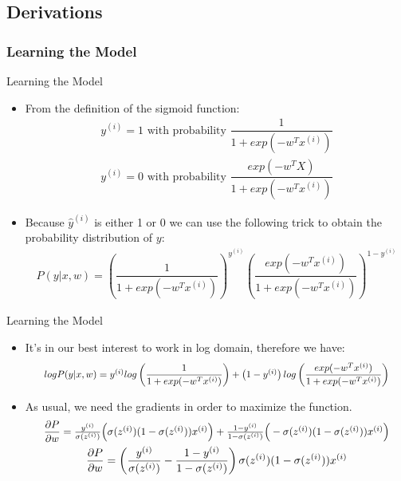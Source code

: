 \subsection{Derivations}
\subsubsection{Learning the Model}
\begin{frame}{Learning the Model}
	\begin{itemize}
		\item From the definition of the sigmoid function:
		\begin{gather*}
		y^{(i)} = 1 \text{ with probability } \dfrac{1}{1+exp(-w^Tx^{(i)})}\\
		y^{(i)} = 0 \text{ with probability } \dfrac{exp(-w^TX)}{1+exp(-w^Tx^{(i)})}
		\end{gather*}
		\item Because $\hat{y}^{(i)}$ is either 1 or 0 we can use the following trick to obtain the probability distribution of $y$:
		\begin{gather*}
		P(y|x,w) = \left(\dfrac{1}{1+exp(-w^Tx^{(i)})}\right)^{y^{(i)}}\left(\dfrac{exp(-w^Tx^{(i)})}{1+exp(-w^Tx^{(i)})}\right)^{1-y^{(i)}}
		\end{gather*}
	\end{itemize}
\end{frame}

\begin{frame}{Learning the Model}
	\begin{itemize}
		\item It's in our best interest to work in log domain, therefore we have:
		\begin{gather*}
		\resizebox{0.9\textwidth}{!}{$
		logP(y|x,w) = y^{(i)}log\left(\dfrac{1}{1+exp(-w^Tx^{(i)})}\right)+\left(1-y^{(i)}\right)log\left(\dfrac{exp(-w^Tx^{(i)})}{1+exp(-w^Tx^{(i)})}\right)$}
		\end{gather*}
		\item As usual, we need the gradients in order to maximize the function.
		\begin{gather*}
		\resizebox{0.9\textwidth}{!}{$\dfrac{\partial P}{\partial w} = \frac{y^{(i)}}{\sigma(z^{(i)})}\Big(\sigma(z^{(i)})(1-\sigma(z^{(i)}))x^{(i)}\Big) + \frac{1-y^{(i)}}{1-\sigma(z^{(i)})} \Big( -\sigma(z^{(i)})(1-\sigma(z^{(i)}))x^{(i)} \Big)$}\\
		\dfrac{\partial P}{\partial w} = \left(\frac{y^{(i)}}{\sigma(z^{(i)})} - \frac{1-y^{(i)}}{1-\sigma(z^{(i)})}\right) \sigma(z^{(i)})(1-\sigma(z^{(i)}))x^{(i)}
		\end{gather*}
	\end{itemize}
\end{frame}

